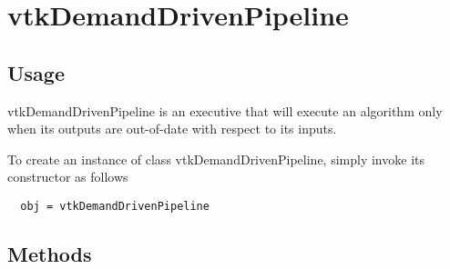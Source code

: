 \section{vtkDemandDrivenPipeline}

\subsection{Usage}

 vtkDemandDrivenPipeline is an executive that will execute an
 algorithm only when its outputs are out-of-date with respect to its
 inputs.

To create an instance of class vtkDemandDrivenPipeline, simply
invoke its constructor as follows
\begin{verbatim}
  obj = vtkDemandDrivenPipeline
\end{verbatim}
\subsection{Methods}

